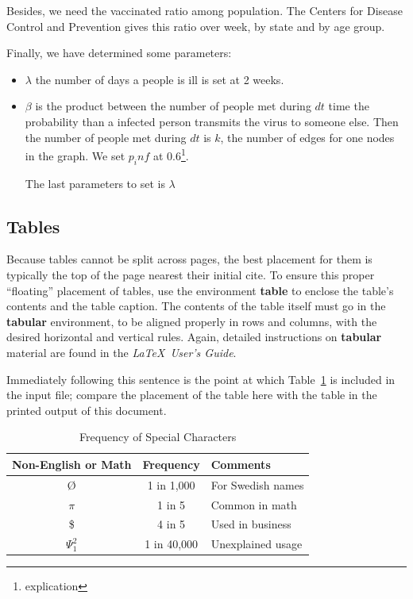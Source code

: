  Besides, we need the vaccinated ratio among population. The Centers for Disease Control and Prevention gives this ratio over week, by state and by age group.
 
 Finally, we have determined some parameters:
 \begin{itemize}
     \item $\lambda$ the number of days a people is ill is set at 2 weeks.
     \item $\beta$ is the product between the number of people met during $dt$ time the probability than a infected person transmits the virus to someone else. Then the number of people met during $dt$ is $k$, the number of edges for one nodes in the graph. We set $p_inf$ at 0.6\footnote{explication}.

The last parameters to set is $\lambda$
 \end{itemize}


\subsection{Tables}
Because tables cannot be split across pages, the best
placement for them is typically the top of the page
nearest their initial cite.  To
ensure this proper ``floating'' placement of tables, use the
environment \textbf{table} to enclose the table's contents and
the table caption.  The contents of the table itself must go
in the \textbf{tabular} environment, to
be aligned properly in rows and columns, with the desired
horizontal and vertical rules.  Again, detailed instructions
on \textbf{tabular} material
are found in the \textit{\LaTeX\ User's Guide}.

Immediately following this sentence is the point at which
Table~\ref{tab:freq} is included in the input file; compare the
placement of the table here with the table in the printed
output of this document.

\begin{table}
  \caption{Frequency of Special Characters}
  \label{tab:freq}
  \begin{tabular}{ccl}
    \toprule
    Non-English or Math&Frequency&Comments\\
    \midrule
    \O & 1 in 1,000& For Swedish names\\
    $\pi$ & 1 in 5& Common in math\\
    \$ & 4 in 5 & Used in business\\
    $\Psi^2_1$ & 1 in 40,000& Unexplained usage\\
  \bottomrule
\end{tabular}
\end{table}

